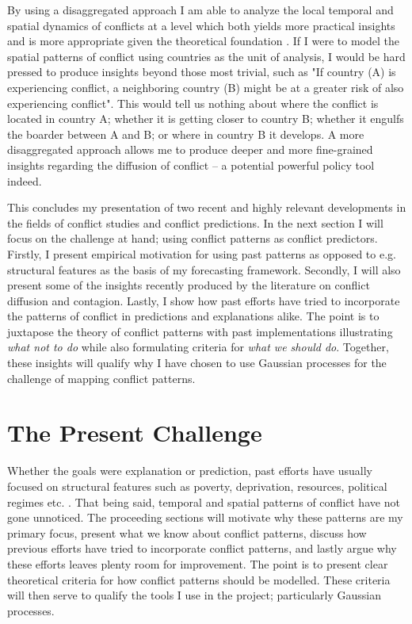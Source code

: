 \documentclass[a4paper]{article}
\begin{document}
By using a disaggregated approach I am able to analyze the local temporal and spatial dynamics of conflicts at a level which both yields more practical insights and is more appropriate given the theoretical foundation \citep[446]{ol2010afghanistan}. If I were to model the spatial patterns of conflict using countries as the unit of analysis, I would be hard pressed to produce insights beyond those most trivial, such as "If country (A) is experiencing conflict, a neighboring country (B) might be at a greater risk of also experiencing conflict". This would tell us nothing about where the conflict is located in country A; whether it is getting closer to country B; whether it engulfs the boarder between A and B; or where in country B it develops. A more disaggregated approach allows me to produce deeper and more fine-grained insights regarding the diffusion of conflict -- a potential powerful policy tool indeed.\par 

This concludes my presentation of two recent and highly relevant developments in the fields of conflict studies and conflict predictions. In the next section I will focus on the challenge at hand; using conflict patterns as conflict predictors. Firstly, I present empirical motivation for using past patterns as opposed to e.g. structural features as the basis of my forecasting framework. Secondly, I will also present some of the insights recently produced by the literature on conflict diffusion and contagion. Lastly, I show how past efforts have tried to incorporate the patterns of conflict in predictions and explanations alike. The point is to juxtapose the theory of conflict patterns with past implementations illustrating \emph{what not to do} while also formulating criteria for \emph{what we should do}. Together, these insights will qualify why I have chosen to use Gaussian processes for the challenge of mapping conflict patterns.\par

\section{The Present Challenge} %

Whether the goals were explanation or prediction, past efforts have usually focused on structural features such as poverty, deprivation, resources, political regimes etc. \citep[10]{chadefaux2017conflict}. That being said, temporal and spatial patterns of conflict have not gone unnoticed. The proceeding sections will motivate why these patterns are my primary focus, present what we know about conflict patterns, discuss how previous efforts have tried to incorporate conflict patterns, and lastly argue why these efforts leaves plenty room for improvement. The point is to present clear theoretical criteria for how conflict patterns should be modelled. These criteria will then serve to qualify the tools I use in the project; particularly Gaussian processes.\par 
\end{document}
